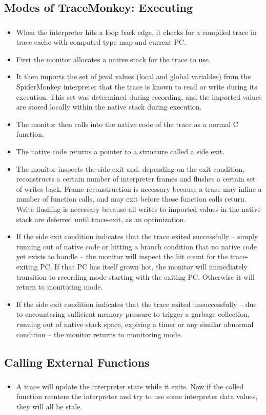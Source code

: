 \documentclass[mathserif,10pt]{beamer}
\begin{document}
\subsection{Modes of TraceMonkey: Executing}
\frame
{
  \frametitle{\subsecname}
  \begin{itemize} 
  \item
    When the interpreter hits a loop back edge, it checks for a compiled trace in trace cache with computed type map and current PC.
  \item 
    First the monitor allocates a native stack for the trace to use.
 \item   
It then imports the set of jsval values (local and global variables) from the SpiderMonkey interpreter that the trace is known to read or write during its execution. This set was determined during recording, and the imported values are stored locally within the native stack during execution.
\item
The monitor then calls into the native code of the trace as a normal C function.
\item
The native code returns a pointer to a structure called a side exit.
\item
The monitor inspects the side exit and, depending on the exit condition, reconstructs a certain number of interpreter frames and flushes a certain set of writes back. Frame reconstruction is necessary because a trace may inline a number of function calls, and may exit before those function calls return. Write flushing is necessary because all writes to imported values in the native stack are deferred until trace-exit, as an optimization.
\item
If the side exit condition indicates that the trace exited successfully -- simply running out of native code or hitting a branch condition that no native code yet exists to handle -- the monitor will inspect the hit count for the trace-exiting PC. If that PC has itself grown hot, the monitor will immediately transition to recording mode starting with the exiting PC. Otherwise it will return to monitoring mode.
\item
If the side exit condition indicates that the trace exited unsuccessfully -- due to encountering sufficient memory pressure to trigger a garbage collection, running out of native stack space, expiring a timer or any similar abnormal condition -- the monitor returns to monitoring mode.
  \end{itemize}  
}

\subsection{Calling External Functions}
\frame
{
  \frametitle{\subsecname}
  \begin{itemize}
    \item A trace will update the interpreter state while it exits. Now if the called function
      reenters the interpreter and try to use some interpreter data values, they will all be stale.
  \end{itemize}
}
\end{document}
